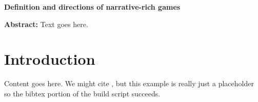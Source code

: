 \documentclass[a4paper]{article}
\newcommand{\projecttitle}{Definition and directions of narrative-rich games}
\begin{document}
\begin{center}
\fontsize{14}{16.8}\selectfont
\bf \projecttitle
\end{center}

\vspace{-0.25in}
\begin{center}
\iftoggle{blind}{
}{
Paul Gestwicki, others, Ball State University\\
pvgestwicki@bsu.edu\\
}
\end{center}


%
\begin{adjustwidth}{0.5in}{0.5in}
  \textbf{Abstract:}
 Text goes here.
\end{adjustwidth}

\section{Introduction}

Content goes here.
We might cite \citet{Koster2013}, but this example is really just a placeholder
so the bibtex portion of the build script succeeds.




\end{document}

